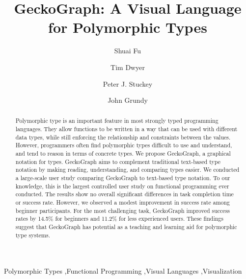 \documentclass[preprint,12pt]{elsarticle}
\begin{document}
\begin{frontmatter}

 \author{Shuai Fu}

 \author{Tim Dwyer}

 \author{Peter J. Stuckey}

 \author{John Grundy}




\title{GeckoGraph: A Visual Language for Polymorphic Types}

\begin{abstract}
Polymorphic type is an important feature in most strongly typed programming languages. They allow functions to be written in a way that can be used with different data types, while still enforcing the relationship and constraints between the values. However, programmers often find polymorphic types difficult to use and understand, and tend to reason in terms of concrete types. We propose GeckoGraph, a graphical notation for types. GeckoGraph aims to complement traditional text-based type notation by making reading, understanding, and comparing types easier. We conducted a large-scale user study comparing GeckoGraph to text-based type notation. To our knowledge, this is the largest controlled user study on functional programming ever conducted. 
The results show no overall significant differences in task completion time or success rate. However, we observed a modest improvement in success rate among beginner participants. For the most challenging task, GeckoGraph improved success rates by 14.5\% for beginners and 11.2\% for less experienced users. These findings suggest that GeckoGraph has potential as a teaching and learning aid for polymorphic type systems.
\end{abstract}

\begin{keyword}


Polymorphic Types \sep Functional Programming \sep Visual Languages \sep Visualization
\end{keyword}

\end{frontmatter}

\linenumbers
\end{document}
